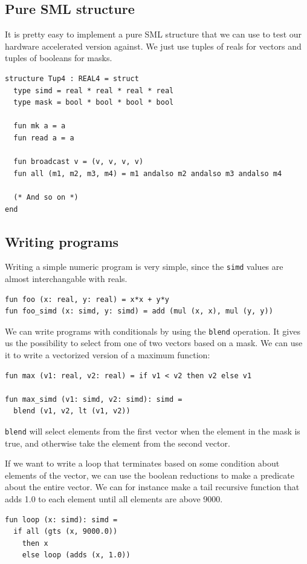 \documentclass{article}
\begin{document}
\subsection{Pure SML structure}

It is pretty easy to implement a pure SML structure that we can use to test our hardware accelerated version against. We just use tuples of reals for vectors and tuples of booleans for masks.
\begin{lstlisting}[frame=single, label={lst:tup4}, caption={Implementation of \texttt{REAL4} using tuples}]
structure Tup4 : REAL4 = struct
  type simd = real * real * real * real
  type mask = bool * bool * bool * bool

  fun mk a = a
  fun read a = a

  fun broadcast v = (v, v, v, v)
  fun all (m1, m2, m3, m4) = m1 andalso m2 andalso m3 andalso m4

  (* And so on *)
end
\end{lstlisting}

\subsection{Writing programs}

Writing a simple numeric program is very simple, since the \verb!simd! values are almost interchangable with reals.
\begin{lstlisting}[frame=single, label={lst:numeric}, caption={Numeric program}]
fun foo (x: real, y: real) = x*x + y*y
fun foo_simd (x: simd, y: simd) = add (mul (x, x), mul (y, y))
\end{lstlisting}
We can write programs with conditionals by using the \texttt{blend} operation. It gives us the possibility to select from one of two vectors based on a mask. We can use it to write a vectorized version of a maximum function:
\begin{lstlisting}[frame=single, label={lst:max}, caption={Max function}]
fun max (v1: real, v2: real) = if v1 < v2 then v2 else v1

fun max_simd (v1: simd, v2: simd): simd =
  blend (v1, v2, lt (v1, v2))
\end{lstlisting}
\texttt{blend} will select elements from the first vector when the element in the mask is true, and otherwise take the element from the second vector.

If we want to write a loop that terminates based on some condition about elements of the vector, we can use the boolean reductions to make a predicate about the entire vector.
We can for instance make a tail recursive function that adds 1.0 to each element until all elements are above 9000.
\begin{lstlisting}[frame=single, label={lst:max}, caption={Iteration with guard}]
fun loop (x: simd): simd =
  if all (gts (x, 9000.0))
    then x
    else loop (adds (x, 1.0))
\end{lstlisting}
\end{document}
